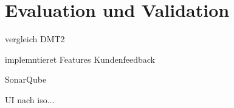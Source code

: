 
\chapter{Evaluation und Validation}

vergleich DMT2

implemntieret Features
Kundenfeedback

SonarQube

UI nach iso...